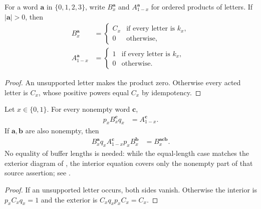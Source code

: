\begin{lemma}
    \label{thm:mpug_czx_action_words}
    \leanok
    For a word $\mathbf a$ in $\{0,1,2,3\}$, write $B_x^{\mathbf a}$
    and $A_{1-x}^{\mathbf a}$ for ordered products of letters. If
    $|\mathbf a|>0$, then
    \begin{align}
        B_x^{\mathbf a}     & =
        \begin{cases}C_x&\text{if every letter is }k_x,\\0&\text{otherwise},\end{cases} \\
        A_{1-x}^{\mathbf a} & =
        \begin{cases}1&\text{if every letter is }k_x,\\0&\text{otherwise}.\end{cases}
        \label{eq:mpug_czx_action_words}
    \end{align}
\end{lemma}
\begin{proof}\leanok
    An unsupported letter makes the product zero. Otherwise every acted
    letter is $C_x$, whose positive powers equal $C_x$ by idempotency.
\end{proof}

\begin{lemma}
    \label{thm:mpug_czx_printed_action_words}
    \leanok
    Let $x\in\{0,1\}$. For every nonempty word $\mathbf c$,
    \begin{align}
        p_xB_x^{\mathbf c}q_x & =A_{1-x}^{\mathbf c}.
        \label{eq:mpug_czx_printed_interior}
    \end{align}
    If $\mathbf a,\mathbf b$ are also nonempty, then
    \begin{align}
        B_x^{\mathbf a}q_xA_{1-x}^{\mathbf c}p_xB_x^{\mathbf b}
         & =B_x^{\mathbf a\mathbf c\mathbf b}.
        \label{eq:mpug_czx_printed_exterior}
    \end{align}
    No equality of buffer lengths is needed: while the equal-length case
    matches the exterior diagram of
    \cite[lines~1788--1838]{FrancoRubio2025MPUGauging}, the interior
    equation covers only the nonempty part of that source assertion; see
    \cite{gap:fbc25_czx_action_empty_word}.
\end{lemma}
\begin{proof}\leanok
    If an unsupported letter occurs, both sides vanish. Otherwise the
    interior is $p_xC_xq_x=1$ and the exterior is $C_xq_xp_xC_x=C_x$.
\end{proof}


